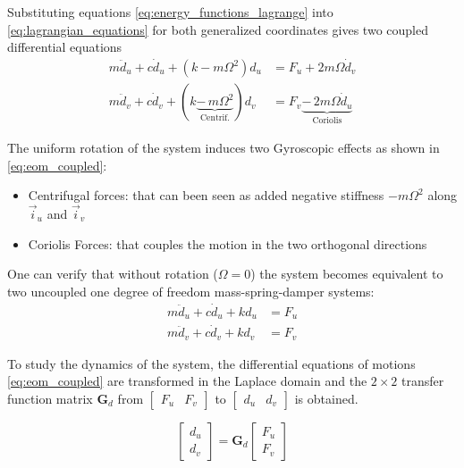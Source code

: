 \documentclass[10pt]{iopart}
\begin{document}
Substituting equations \eqref{eq:energy_functions_lagrange} into \eqref{eq:lagrangian_equations} for both generalized coordinates gives two coupled differential equations
\begin{subequations}
\label{eq:eom_coupled}
  \begin{align}
    m \ddot{d}_u + c \dot{d}_u + ( k - m \Omega^2 ) d_u &= F_u + 2 m \Omega \dot{d}_v \\
    m \ddot{d}_v + c \dot{d}_v + ( k \underbrace{-\,m \Omega^2}_{\text{Centrif.}} ) d_v &= F_v \underbrace{-\,2 m \Omega \dot{d}_u}_{\text{Coriolis}}
  \end{align}
\end{subequations}

The uniform rotation of the system induces two Gyroscopic effects as shown in \eqref{eq:eom_coupled}:
\begin{itemize}
\item Centrifugal forces: that can been seen as added negative stiffness \(- m \Omega^2\) along \(\vec{i}_u\) and \(\vec{i}_v\)
\item Coriolis Forces: that couples the motion in the two orthogonal directions
\end{itemize}

One can verify that without rotation (\(\Omega = 0\)) the system becomes equivalent to two uncoupled one degree of freedom mass-spring-damper systems:
\begin{subequations}
\label{eq:oem_no_rotation}
  \begin{align}
    m \ddot{d}_u + c \dot{d}_u + k d_u &= F_u \\
    m \ddot{d}_v + c \dot{d}_v + k d_v &= F_v
  \end{align}
\end{subequations}

\par
To study the dynamics of the system, the differential equations of motions \eqref{eq:eom_coupled} are transformed in the Laplace domain and the \(2 \times 2\) transfer function matrix \(\bm{G}_d\) from \(\begin{bmatrix}F_u & F_v\end{bmatrix}\) to \(\begin{bmatrix}d_u & d_v\end{bmatrix}\) is obtained.

\begin{equation}
\label{eq:Gd_mimo_tf}
  \begin{bmatrix} d_u \\ d_v \end{bmatrix} = \bm{G}_d \begin{bmatrix} F_u \\ F_v \end{bmatrix}
\end{equation}
\end{document}
